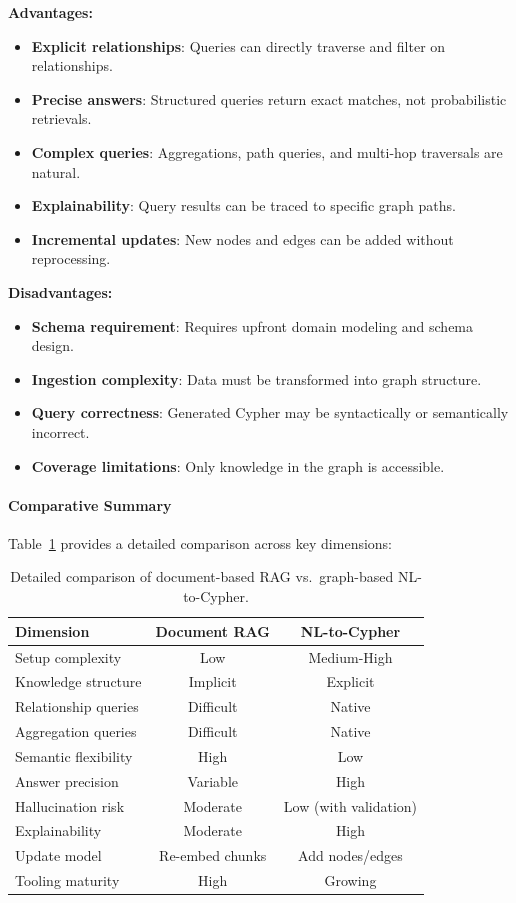 \documentclass[a4paper,twoside]{sapthesis}
\begin{document}
\textbf{Advantages:}
\begin{itemize}
    \item \textbf{Explicit relationships}: Queries can directly traverse and filter on relationships.
    \item \textbf{Precise answers}: Structured queries return exact matches, not probabilistic retrievals.
    \item \textbf{Complex queries}: Aggregations, path queries, and multi-hop traversals are natural.
    \item \textbf{Explainability}: Query results can be traced to specific graph paths.
    \item \textbf{Incremental updates}: New nodes and edges can be added without reprocessing.
\end{itemize}

\textbf{Disadvantages:}
\begin{itemize}
    \item \textbf{Schema requirement}: Requires upfront domain modeling and schema design.
    \item \textbf{Ingestion complexity}: Data must be transformed into graph structure.
    \item \textbf{Query correctness}: Generated Cypher may be syntactically or semantically incorrect.
    \item \textbf{Coverage limitations}: Only knowledge in the graph is accessible.
\end{itemize}

\paragraph{Comparative Summary}

Table~\ref{tab:rag-vs-graph-detailed} provides a detailed comparison across key dimensions:

\begin{table}[ht]
\centering
\caption{Detailed comparison of document-based RAG vs.\ graph-based NL-to-Cypher.}
\label{tab:rag-vs-graph-detailed}
\small
\begin{tabular}{lcc}
\hline
\textbf{Dimension} & \textbf{Document RAG} & \textbf{NL-to-Cypher} \\
\midrule
Setup complexity & Low & Medium-High \\
Knowledge structure & Implicit & Explicit \\
Relationship queries & Difficult & Native \\
Aggregation queries & Difficult & Native \\
Semantic flexibility & High & Low \\
Answer precision & Variable & High \\
Hallucination risk & Moderate & Low (with validation) \\
Explainability & Moderate & High \\
Update model & Re-embed chunks & Add nodes/edges \\
Tooling maturity & High & Growing \\
\midrule
\end{tabular}
\end{table}
\end{document}
